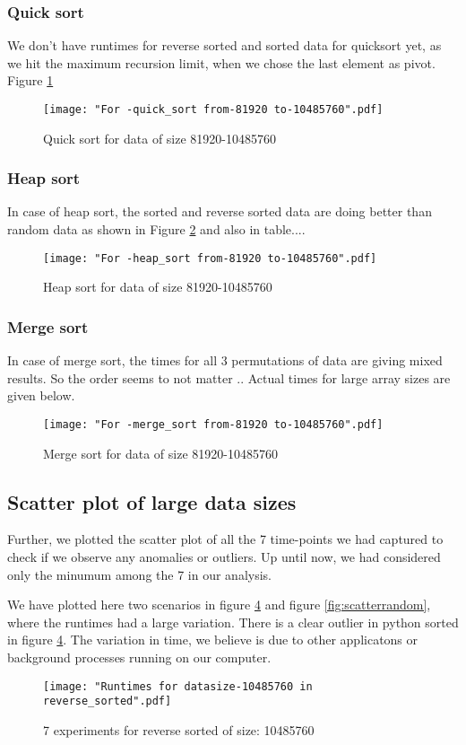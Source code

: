 \documentclass[sigconf,  natbib, screen]{acmart}
\begin{document}
\subsubsection{Quick sort}
We don't have runtimes for reverse sorted and sorted data for quicksort yet, as we hit the maximum recursion limit, when we chose the last element as pivot. Figure \ref{fig:quicksort}
\begin{figure}[ht]
\texttt{[image: "For -quick\_sort from-81920 to-10485760".pdf]}
    \caption{Quick sort for data of size 81920-10485760 }
    \label{fig:quicksort}
\end{figure}

\subsubsection{Heap sort}
In case of heap sort, the sorted and reverse sorted data are doing better than random data as shown in Figure \ref{fig:heapsort} and also in table....
\begin{figure}[ht]
\texttt{[image: "For -heap\_sort from-81920 to-10485760".pdf]}
    \caption{Heap sort for data of size 81920-10485760 }
    \label{fig:heapsort}
\end{figure}

\subsubsection{Merge sort}
In case of merge sort, the times for all 3 permutations of data are giving mixed results. So the order seems to not matter .. Actual times for large array sizes are given below.
\begin{figure}[ht]
\texttt{[image: "For -merge\_sort from-81920 to-10485760".pdf]}
    \caption{Merge sort for data of size 81920-10485760 }
    \label{fig:mergesort}
\end{figure}


\subsection{Scatter plot of large data sizes }\label{scatter}
Further, we plotted the scatter plot of all the 7 time-points we had captured to check if we observe any anomalies or outliers. Up until now, we had considered only the minumum among the 7 in our analysis.

We have plotted here two scenarios in figure \ref{fig:scatterreverse} and   figure \ref{fig:scatterrandom}, where the runtimes had a large variation. There is a clear outlier in python sorted in figure \ref{fig:scatterreverse}. The variation in time, we believe is due to other applicatons or background processes running on our computer.
\begin{figure}[ht]
\texttt{[image: "Runtimes for datasize-10485760 in reverse\_sorted".pdf]}
    \caption{7 experiments for reverse sorted of size: 10485760 }
    \label{fig:scatterreverse}
\end{figure}
\end{document}
